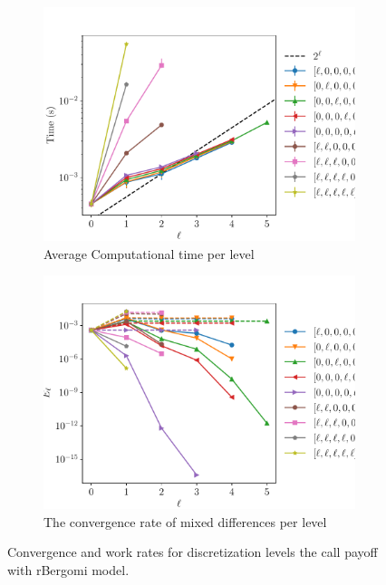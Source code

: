 \documentclass[11pt]{article}
\begin{document}
\begin{figure}[!h]
	\centering
	\begin{subfigure}{.5\textwidth}
		\centering
		\includegraphics[width=0.95\linewidth]{./figures/rbergomi_4_steps_K_1_2/level_work.pdf}
		\caption{Average Computational time per level}
		\label{fig:misc_rbergomi_4_steps_K_2_sub3}
	\end{subfigure}%
	\begin{subfigure}{.5\textwidth}
		\centering
		\includegraphics[width=0.95\linewidth]{./figures/rbergomi_4_steps_K_1_2/levels_error_rate.pdf}
		\caption{  The convergence rate of mixed differences per level}
		\label{fig:misc_rbergomi_4_steps_K_1_2_sub4}
	\end{subfigure}%
	\caption{Convergence and work rates for discretization levels  the call payoff with rBergomi model.}
	\label{fig:misc_rbergomi_4_steps_K_1_2_2}
\end{figure}
\end{document}
